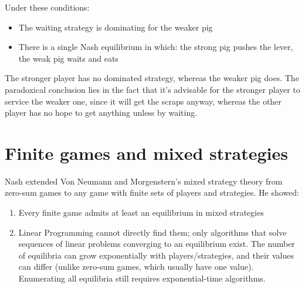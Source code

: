Under these conditions: 
\begin{itemize}
	\item The waiting strategy is dominating for the weaker pig
	
	\item There is a single Nash equilibrium in which: the strong pig pushes the lever, the weak pig waits and eats
\end{itemize}

The stronger player has no dominated strategy, whereas the  weaker pig does. The paradoxical conclusion lies in the fact that it's advisable for the stronger player to service the weaker one, since it will get the scraps anyway, whereas the other player has no hope to get anything unless by waiting.

\section{Finite games and mixed strategies}
Nash extended Von Neumann and Morgenstern’s mixed strategy theory from zero-sum games to any game with finite sets of players and strategies. He showed:
\begin{enumerate}
	\item Every finite game admits at least an equilibrium in mixed strategies
	
	\item Linear Programming cannot directly find them; only algorithms that solve sequences of linear problems converging to an equilibrium exist. The number of equilibria can grow exponentially with players/strategies, and their values can differ (unlike zero-sum games, which usually have one value). Enumerating all equilibria still requires exponential-time algorithms.
\end{enumerate}

